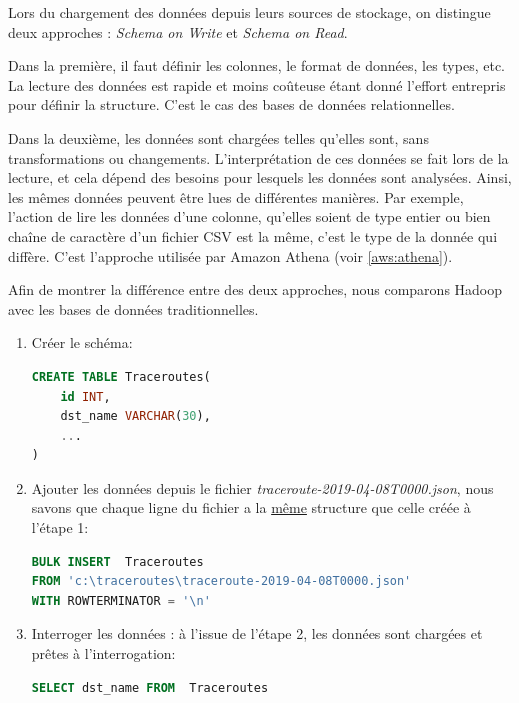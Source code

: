 		Lors du chargement des données depuis leurs sources de stockage, on distingue deux approches : \textit{ Schema on Write} et \textit{Schema on Read}.
		
		Dans la première, il faut définir les colonnes, le format de données, les types, etc. La lecture des données est rapide et moins coûteuse étant donné l'effort entrepris pour définir la structure. C'est le cas des bases de données relationnelles.
		
		Dans la deuxième, les données sont chargées telles qu'elles sont, sans transformations ou changements. L'interprétation de ces données se fait lors de la lecture, et cela dépend des besoins pour lesquels les données sont analysées. Ainsi, les mêmes données peuvent être lues de différentes manières. Par exemple, l'action  de lire les données  d'une colonne, qu'elles soient de type entier ou bien chaîne de caractère d'un fichier CSV est la même, c'est le type de la donnée qui diffère. C'est l'approche utilisée par Amazon Athena (voir \ref{aws:athena}). 
		
Afin de montrer la différence entre des deux approches, nous comparons Hadoop avec les bases de données traditionnelles. 



\begin{enumerate}
	\item Créer le schéma:
\begin{lstlisting}[language = sql, basicstyle=\small]
CREATE TABLE Traceroutes(
	id INT,
	dst_name VARCHAR(30),
	...
)
\end{lstlisting}
		
	\item  Ajouter les données depuis le fichier \textit{traceroute-2019-04-08T0000.json}, nous savons que chaque ligne du fichier a la \underline{même} structure que celle créée à l'étape 1:
\begin{lstlisting}[language = sql, basicstyle=\small]
BULK INSERT  Traceroutes
FROM 'c:\traceroutes\traceroute-2019-04-08T0000.json'
WITH ROWTERMINATOR = '\n'
\end{lstlisting}
	
	\item Interroger les données : à l'issue de l'étape 2,  les données sont chargées et prêtes à l'interrogation: 
\begin{lstlisting}[language = sql, basicstyle=\small]
SELECT dst_name FROM  Traceroutes
\end{lstlisting}
	\end{enumerate}

